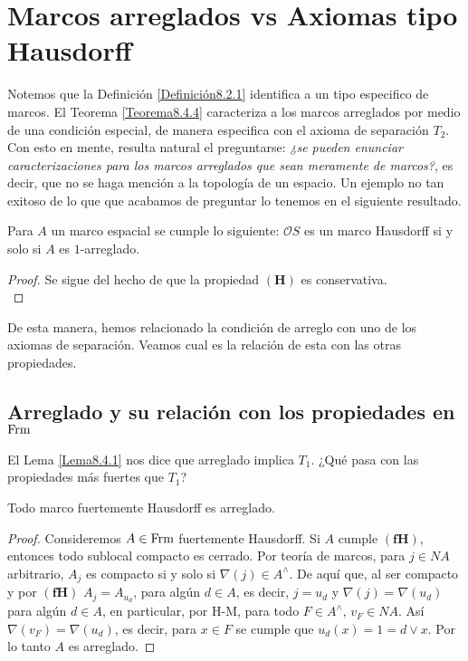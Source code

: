 \chapter{Marcos arreglados vs Axiomas tipo Hausdorff}\label{Relación MA y AH}

Notemos que la Definición \ref{Definición8.2.1} identifica a un tipo especifico de marcos. El Teorema \ref{Teorema8.4.4} caracteriza a los marcos arreglados por medio de una condición especial, de manera especifica con el axioma de separación $T_2$.
Con esto en mente, resulta natural el preguntarse: \emph{¿se pueden enunciar caracterizaciones para los marcos arreglados que sean meramente de marcos?}, es decir, que no se haga mención a la topología de un espacio. Un ejemplo no tan exitoso de lo que 
que acabamos de preguntar lo tenemos en el siguiente resultado.

\begin{cor}\label{TadyHausdorff}
Para $A$ un marco espacial se cumple lo siguiente: $\mathcal{O}S$ es un marco Hausdorff si y solo si $A$ es $1$-arreglado. 
\end{cor}

\begin{proof}
Se sigue del hecho de que la propiedad $\mathbf{(H)}$ es conservativa.\\
\end{proof}

De esta manera, hemos relacionado la condición de arreglo con uno de los axiomas de separación. Veamos cual es la relación de esta con las otras propiedades.\\

\section{Arreglado y su relación con los propiedades en $\mathrm{Frm}$}

El Lema \ref{Lema8.4.1} nos dice que arreglado implica $T_1$. ¿Qué pasa con las propiedades más fuertes que $T_1$?

\begin{lem}\label{TadyFHausdorff}
    Todo marco fuertemente Hausdorff es arreglado.
\end{lem}

\begin{proof}
    Consideremos $A\in \mathrm{Frm}$ fuertemente Hausdorff. Si $A$ cumple $\mathbf{(fH)}$, entonces todo sublocal compacto es cerrado. Por teoría de marcos, para $j\in NA$ arbitrario, $A_j$ es compacto si y solo si $\nabla(j)\in A^\wedge$. De aquí que, al ser compacto y por $\mathbf{(fH)}$ $A_j=A_{u_d}$, para algún $d\in A$, es decir, $j=u_d$ y $\nabla(j)=\nabla(u_d)$ para algún $d\in A$, en particular, por H-M, para todo $F\in A^\wedge$, $v_F\in NA$. Así $\nabla(v_F)=\nabla(u_d)$, es decir, para $x\in F$ se cumple que $u_d(x)=1=d\vee x$. Por lo tanto $A$ es arreglado.
\end{proof}

